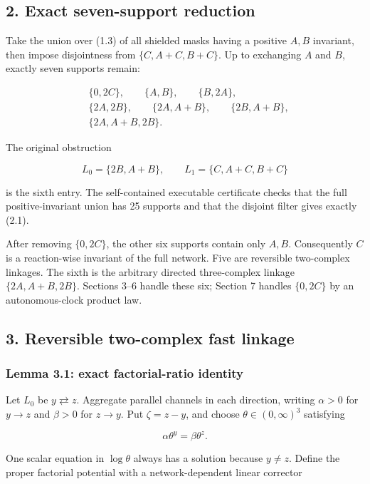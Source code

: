 \subsection{2. Exact seven-support
reduction}

Take the union over (1.3) of all shielded masks having a positive
\(A,B\) invariant, then impose disjointness from \(\{C,A+C,B+C\}\). Up
to exchanging \(A\) and \(B\), exactly seven supports remain:

\[
\begin{split}
 &\{0,2C\},\qquad \{A,B\},\qquad \{B,2A\},\\
 &\{2A,2B\},\qquad \{2A,A+B\},\qquad \{2B,A+B\},\\
 &\{2A,A+B,2B\}.
\end{split}
\tag{2.1}
\]

The original obstruction

\[
 L_0=\{2B,A+B\},\qquad L_1=\{C,A+C,B+C\}
\tag{2.2}
\]

is the sixth entry. The self-contained executable certificate checks
that the full positive-invariant union has 25 supports and that the
disjoint filter gives exactly (2.1).

After removing \(\{0,2C\}\), the other six supports contain only
\(A,B\). Consequently \(C\) is a reaction-wise invariant of the full
network. Five are reversible two-complex linkages. The sixth is the
arbitrary directed three-complex linkage \(\{2A,A+B,2B\}\). Sections
3--6 handle these six; Section 7 handles \(\{0,2C\}\) by an
autonomous-clock product law.

\subsection{3. Reversible two-complex fast
linkage}

\subsubsection{Lemma 3.1: exact factorial-ratio
identity}

Let \(L_0\) be \(y\rightleftarrows z\). Aggregate parallel channels in
each direction, writing \(\alpha>0\) for \(y\to z\) and \(\beta>0\) for
\(z\to y\). Put \(\zeta=z-y\), and choose \(\theta\in(0,\infty)^3\)
satisfying

\[
 \alpha\theta^y=\beta\theta^z.
\tag{3.1}
\]

One scalar equation in \(\log\theta\) always has a solution because
\(y\ne z\). Define the proper factorial potential with a
network-dependent linear corrector

